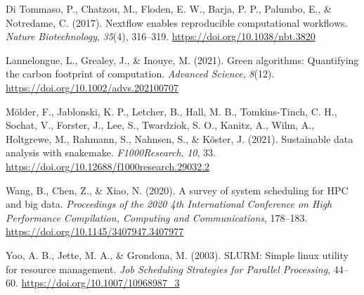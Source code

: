 \documentclass[
]{article}
\newlength{\cslhangindent}
\newenvironment{CSLReferences}[2] %
 {\begin{list}{}{%
  \setlength{\itemindent}{0pt}
  \setlength{\leftmargin}{0pt}
  \setlength{\parsep}{0pt}
  \ifodd #1
   \setlength{\leftmargin}{\cslhangindent}
   \setlength{\itemindent}{-1\cslhangindent}
  \fi
  \setlength{\itemsep}{#2\baselineskip}}}
 {\end{list}}
\begin{document}
\label{refs}
\begin{CSLReferences}{1}{0}
Di Tommaso, P., Chatzou, M., Floden, E. W., Barja, P. P., Palumbo, E.,
\& Notredame, C. (2017). Nextflow enables reproducible computational
workflows. \emph{Nature Biotechnology}, \emph{35}(4), 316--319.
\url{https://doi.org/10.1038/nbt.3820}

Lannelongue, L., Grealey, J., \& Inouye, M. (2021). Green algorithms:
Quantifying the carbon footprint of computation. \emph{Advanced
Science}, \emph{8}(12). \url{https://doi.org/10.1002/advs.202100707}

Mölder, F., Jablonski, K. P., Letcher, B., Hall, M. B., Tomkins-Tinch,
C. H., Sochat, V., Forster, J., Lee, S., Twardziok, S. O., Kanitz, A.,
Wilm, A., Holtgrewe, M., Rahmann, S., Nahnsen, S., \& Köster, J. (2021).
Sustainable data analysis with snakemake. \emph{F1000Research},
\emph{10}, 33. \url{https://doi.org/10.12688/f1000research.29032.2}

Wang, B., Chen, Z., \& Xiao, N. (2020). A survey of system scheduling
for HPC and big data. \emph{Proceedings of the 2020 4th International
Conference on High Performance Compilation, Computing and
Communications}, 178--183. \url{https://doi.org/10.1145/3407947.3407977}

Yoo, A. B., Jette, M. A., \& Grondona, M. (2003). SLURM: Simple linux
utility for resource management. \emph{Job Scheduling Strategies for
Parallel Processing}, 44--60. \url{https://doi.org/10.1007/10968987_3}

\end{CSLReferences}
\end{document}
